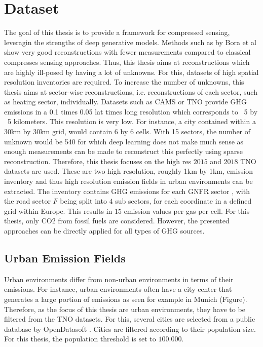 
\chapter{Dataset}\label{chapter:dataset}

The goal of this thesis is to provide a framework for compressed sensing, leveragin the strengths of deep generative models.
Methods such as by Bora et al \parencite{CSUsingAI} show very good reconstructions with fewer measurements compared to classical compresses sensing approaches.
Thus, this thesis aims at reconstructions which are highly ill-posed by having a lot of unknowns.
For this, datasets of high spatial resolution inventories are required.
To increase the number of unknowns, this thesis aims at sector-wise reconstructions, i.e. reconstructions of each sector, such as heating sector, individually.
Datasets such as CAMS \parencite{CAMS} or TNO \parencite{TNO_LowRes}  provide GHG emissions in a 0.1 times 0.05 lat times long resolution which corresponds to ~5 by ~5 kilometers.
This resolution is very low.
For instance, a city contained within a 30km by 30km grid, would contain 6 by 6 cells.
With 15 sectors, the number of unknown would be 540 for which deep learning does not make much sense as enough measurements can be made to reconstruct this perfectly using sparse reconstruction.
Therefore, this thesis focuses on the high res $2015$ \parencite{TNO_HighRes15} and $2018$ \parencite{TNO_HighRes18} TNO datasets are used.
These are two high resolution, roughly 1km by 1km, emission inventory and thus high resolution emission fields in urban environments can be extracted.
The inventory contains GHG emissions for each GNFR sector \parencite{GNFR_Sectors}, with the road sector $F$ being split into $4$ sub sectors, for each coordinate in a defined grid within Europe.
This results in $15$ emission values per gas per cell.
For this thesis, only CO2 from fossil fuels are considered.
However, the presented approaches can be directly applied for all types of GHG sources.

\section{Urban Emission Fields}
Urban environments differ from non-urban environments in terms of their emissions.
For instance, urban environments often have a city center that generates a large portion of emissions as seen for example in Munich (Figure).
Therefore, as the focus of this thesis are urban environments, they have to be filtered from the TNO datasets.
For this, several cities are selected from a public database by OpenDatasoft \parencite{OpenDataSoft}.
Cities are filtered according to their population size.
For this thesis, the population threshold is set to $100.000$.

